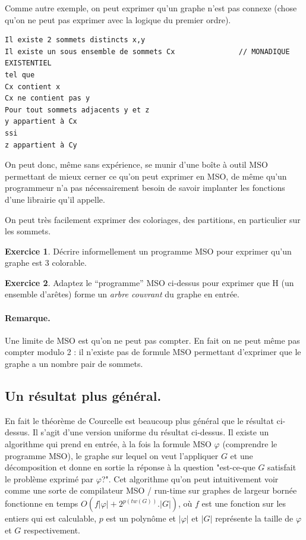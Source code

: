 \documentclass[a4paper,12pt]{article}
\theoremstyle{definition}
\newtheorem{exo}{Exercice}%
\theoremstyle{remark}
\begin{document}
Comme autre exemple, on peut exprimer qu'un graphe n'est pas connexe
(chose qu'on ne peut pas exprimer avec la logique du premier ordre).
\begin{verbatim}
Il existe 2 sommets distincts x,y
Il existe un sous ensemble de sommets Cx               // MONADIQUE EXISTENTIEL
tel que
Cx contient x
Cx ne contient pas y 
Pour tout sommets adjacents y et z
y appartient à Cx
ssi
z appartient à Cy 
\end{verbatim}
On peut donc, même sans expérience, se munir d'une boîte à outil MSO permettant de mieux
cerner ce qu'on peut exprimer en MSO, de même qu'un programmeur n'a
pas nécessairement besoin de savoir implanter les fonctions d'une
librairie qu'il appelle.
 
On peut très facilement exprimer des coloriages, des partitions, en
particulier sur les sommets. 
\begin{exo}
  Décrire informellement un programme MSO pour exprimer qu'un graphe
  est 3 colorable.
\end{exo}

\begin{exo}
  Adaptez le ``programme'' MSO ci-dessus pour exprimer que H (un
  ensemble d'arêtes) forme un \emph{arbre couvrant} du graphe en entrée. 
\end{exo}

\paragraph{Remarque.} Une limite de MSO est qu'on ne peut pas compter. En fait on ne peut
même pas compter modulo 2 : il n'existe pas de
formule MSO permettant d'exprimer que le graphe a un nombre pair de
sommets. 

\subsection*{Un résultat plus général.} 
En fait le théorème de Courcelle
est beaucoup plus général que le 
résultat ci-dessus. Il s'agit d'une version uniforme du résultat
ci-dessus. Il existe un algorithme  qui prend 
en entrée, à la fois la formule MSO $\varphi$ (comprendre le programme
MSO), le graphe sur
lequel on veut l'appliquer $G$ et une décomposition et donne en sortie
la réponse à la question "est-ce-que $G$ satisfait le problème exprimé
par $\varphi$?". Cet algorithme qu'on peut intuitivement voir comme une sorte de compilateur
MSO / run-time sur graphes de largeur bornée fonctionne en temps 
$O(f|\varphi|+ 2^{p(tw(G))}. |G|)$, où $f$ est une fonction sur les
entiers qui est calculable, $p$ est un polynôme et $|\varphi|$ et
$|G|$ représente la taille de $\varphi$ et $G$ respectivement. 
\end{document}
